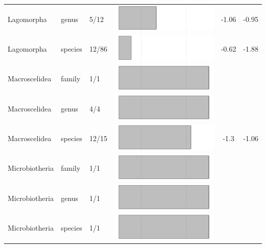 \begin{longtable}{lL{1.8cm}C{2cm}lcc}
  Lagomorpha & genus & 5/12 & \includegraphics[width=0.20\linewidth, height=0.05\linewidth]{Supplementaries/Figures/MissingMammals/Results_1c/Table_figures/bar35.pdf} & -1.06 & -0.95 \\ 
  Lagomorpha & species & 12/86 & \includegraphics[width=0.20\linewidth, height=0.05\linewidth]{Supplementaries/Figures/MissingMammals/Results_1c/Table_figures/bar36.pdf} & -0.62 & -1.88 \\ 
  Macroscelidea & family & 1/1 & \includegraphics[width=0.20\linewidth, height=0.05\linewidth]{Supplementaries/Figures/MissingMammals/Results_1c/Table_figures/bar37.pdf} &   &   \\ 
  Macroscelidea & genus & 4/4 & \includegraphics[width=0.20\linewidth, height=0.05\linewidth]{Supplementaries/Figures/MissingMammals/Results_1c/Table_figures/bar38.pdf} &   &   \\ 
  Macroscelidea & species & 12/15 & \includegraphics[width=0.20\linewidth, height=0.05\linewidth]{Supplementaries/Figures/MissingMammals/Results_1c/Table_figures/bar39.pdf} & -1.3 & -1.06 \\ 
  Microbiotheria & family & 1/1 & \includegraphics[width=0.20\linewidth, height=0.05\linewidth]{Supplementaries/Figures/MissingMammals/Results_1c/Table_figures/bar40.pdf} &   &   \\ 
  Microbiotheria & genus & 1/1 & \includegraphics[width=0.20\linewidth, height=0.05\linewidth]{Supplementaries/Figures/MissingMammals/Results_1c/Table_figures/bar41.pdf} &   &   \\ 
  Microbiotheria & species & 1/1 & \includegraphics[width=0.20\linewidth, height=0.05\linewidth]{Supplementaries/Figures/MissingMammals/Results_1c/Table_figures/bar42.pdf} &   &   \\ 

\end{longtable}
